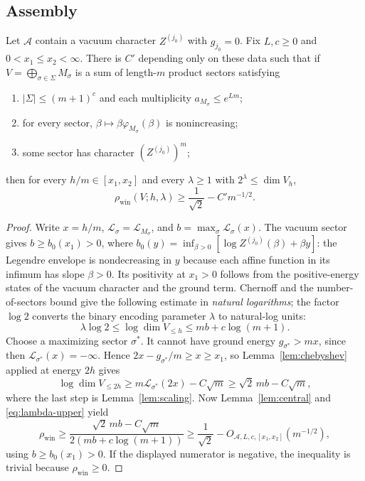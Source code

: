 \documentclass[10pt,a4paper]{article}
\numberwithin{equation}{section}
\theoremstyle{remark}\newtheorem{remark}[theorem]{Remark}\newtheorem{question}[theorem]{Question}
\newcommand{\rhow}{\rho_{\mathrm{win}}}\newcommand{\F}{\mathbb F}\newcommand{\K}{\mathbb K}\newcommand{\Z}{\mathbb Z}\newcommand{\R}{\mathbb R}\newcommand{\cB}{\mathcal L}\newcommand{\wt}{\mathrm{wt}}\newcommand{\dimn}{\operatorname{dim}}\newcommand{\supp}{\operatorname{supp}}
\begin{document}
\subsection{Assembly}
\begin{proposition}\label{prop:assembly}
Let $\mathcal A$ contain a vacuum character $Z^{(j_0)}$ with $g_{j_0}=0$. Fix $L,c\ge0$ and $0<x_1\le x_2<\infty$. There is $C'$ depending only on these data such that if $V=\bigoplus_{\sigma\in\Sigma}M_\sigma$ is a sum of length-$m$ product sectors satisfying
\begin{enumerate}
\item $|\Sigma|\le(m+1)^c$ and each multiplicity $a_{M_\sigma}\le e^{Lm}$;
\item for every sector, $\beta\mapsto\beta\varphi_{M_\sigma}(\beta)$ is nonincreasing;
\item some sector has character $(Z^{(j_0)})^m$;
\end{enumerate}
then for every $h/m\in[x_1,x_2]$ and every $\lambda\ge1$ with $2^\lambda\le\dimn V_h$,
\begin{equation}\label{eq:main-assembly}
\rhow(V;h,\lambda)\ge\frac1{\sqrt2}-C'm^{-1/2}.
\end{equation}
\end{proposition}
\begin{proof}
Write $x=h/m$, $\cB_\sigma=\cB_{M_\sigma}$, and $b=\max_\sigma\cB_\sigma(x)$. The vacuum sector gives $b\ge b_0(x_1)>0$, where $b_0(y)=\inf_{\beta>0}[\log Z^{(j_0)}(\beta)+\beta y]$: the Legendre envelope is nondecreasing in $y$ because each affine function in its infimum has slope $\beta>0$. Its positivity at $x_1>0$ follows from the positive-energy states of the vacuum character and the ground term. Chernoff and the number-of-sectors bound give the following estimate in \emph{natural logarithms}; the factor $\log2$ converts the binary encoding parameter $\lambda$ to natural-log units:
\begin{equation}\label{eq:lambda-upper}
\lambda\log2\le\log\dimn V_{\le h}\le mb+c\log(m+1).
\end{equation}
Choose a maximizing sector $\sigma^*$. It cannot have ground energy $g_{\sigma^*}>mx$, since then $\cB_{\sigma^*}(x)=-\infty$. Hence $2x-g_{\sigma^*}/m\ge x\ge x_1$, so Lemma~\ref{lem:chebyshev} applied at energy $2h$ gives
\[
\log\dimn V_{\le2h}\ge m\cB_{\sigma^*}(2x)-C\sqrt m\ge\sqrt2\,mb-C\sqrt m,
\]
where the last step is Lemma~\ref{lem:scaling}. Now Lemma~\ref{lem:central} and \eqref{eq:lambda-upper} yield
\[
\rhow\ge\frac{\sqrt2\,mb-C\sqrt m}{2(mb+c\log(m+1))}
\ge\frac1{\sqrt2}-O_{\mathcal A,L,c,[x_1,x_2]}(m^{-1/2}),
\]
using $b\ge b_0(x_1)>0$. If the displayed numerator is negative, the inequality is trivial because $\rhow\ge0$.
\end{proof}
\end{document}
